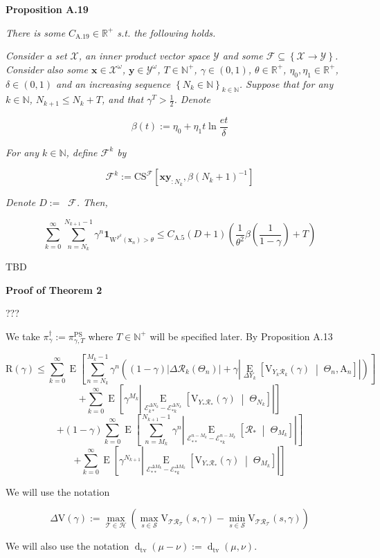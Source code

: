 \documentclass[a4paper]{article}
\newcommand{\Co}[1]{}
\newcommand{\AP}[1]{\left(#1\right)}
\newcommand{\AB}[1]{\left[#1\right]}
\newcommand{\AC}[1]{\left\{#1\right\}}
\newcommand{\ABM}[2]{\left[#1\;\middle\vert\;#2\right]}
\newcommand{\Abs}[1]{\left\vert #1 \right\vert}
\newcommand{\E}[1]{\operatorname{E}\AB{#1}}
\newcommand{\CE}[3]{\underset{#1}{\operatorname{E}}\ABM{#2}{#3}}
\newcommand{\Dtva}[1]{\operatorname{d}_{\text{tv}}\AP{#1}}
\newcommand{\Nats}{\mathbb{N}}
\newcommand{\Reals}{\mathbb{R}}
\newcommand{\St}{\mathcal{S}}
\newcommand{\R}{\mathcal{R}}
\newcommand{\T}{\mathcal{T}}
\newcommand{\Hy}{\mathcal{H}}
\DeclareMathOperator{\RVO}{\dim_{RVO}}
\newcommand{\X}{\mathcal{X}}
\newcommand{\Y}{\mathcal{Y}}
\newcommand{\V}{\mathrm{V}}
\newcommand{\Reg}{\mathrm{R}}
\newcommand{\PSR}{\text{PS}}
\newcommand{\THy}{Y_*}
\newcommand{\SHy}{Y}
\newcommand{\AT}{\mathrm{A}}
\newcommand{\Ev}{\mathcal{E}}
\newcommand{\ET}{N}
\newcommand{\IT}{M}
\newcommand{\F}{\mathcal{F}}
\newcommand{\CS}{\mathrm{CS}}
\newcommand{\W}{\mathrm{W}}
\begin{document}
\textbf{Proposition A.19}\Co{b}

\textit{There is some $C_{\mathrm{A.19}}\in\Reals^+$ s.t. the following holds.}\Co{i}

\textit{Consider a set $\X$, an inner product vector space $\Y$ and some $\F\subseteq\AC{\X\rightarrow\Y}$. Consider also some $\boldsymbol{x}\in\X^\omega$, $\boldsymbol{y}\in\Y^\omega$, $T\in\Nats^+$, $\gamma\in(0,1)$, $\theta\in\Reals^+$, $\eta_0,\eta_1\in\Reals^+$, $\delta\in(0,1)$ and an increasing sequence $\AC{N_k\in\Nats}_{k\in\Nats}$. Suppose that for any $k\in\Nats$, $N_{k+1}\leq N_k+T$, and that $\gamma^T>\frac{1}{2}$. Denote}\Co{i}

$$\beta(t):=\eta_0 + \eta_1t\ln{\frac{et}{\delta}}$$

\textit{For any $k\in\Nats$, define $\F^k$ by}\Co{i}

$$\F^k:=\CS^\F\AB{\boldsymbol{xy}_{:N_k},\beta\AP{N_k+1}^{-1}}$$

\textit{Denote $D:=\RVO\F$. Then,}\Co{i}

$$\sum_{k=0}^\infty\sum_{n=N_k}^{N_{k+1}-1}{\gamma^{n}\boldsymbol{1}_{\W^{F^k}\AP{\boldsymbol{x}_{n}}>\theta}} \leq C_{\mathrm{A.5}}(D+1)\AP{\frac{1}{\theta^2}\beta\AP{\frac{1}{1-\gamma}}+T}$$

TBD

\textbf{Proof of Theorem 2}\Co{b}

???

We take $\pi^\dagger_\gamma:=\pi^\PSR_{\gamma,T}$ where $T\in\Nats^+$ will be specified later. By Proposition A.13

$$\Reg(\gamma)\leq\sum_{k=0}^\infty\E{\sum_{n=\ET_k}^{\IT_k-1}\gamma^{n}\AP{(1-\gamma)\Abs{\Delta\R_k\AP{\Theta_n}}+\gamma\Abs{\CE{\Delta\SHy_k}{\V_{\SHy_k\R_k}(\gamma)}{\Theta_n,\AT_n}}}}$$
$$+\sum_{k=0}^\infty\E{{\gamma^{\IT_k}}\Abs{\CE{\Ev_{k*}^{\Delta\ET_k}-\Ev_{*k}^{\Delta\ET_k}}{\V_{\SHy_*\R_*}(\gamma)}{\Theta_{\ET_k}}}}$$
$$+(1-\gamma)\sum_{k=0}^\infty\E{\sum_{n=\IT_k}^{\ET_{k+1}-1}\gamma^n\Abs{\CE{\Ev_{**}^{n-\IT_k}-\Ev_{*k}^{n-\IT_k}}{\R_*}{\Theta_{\IT_k}}}}$$
$$+\sum_{k=0}^\infty\E{\gamma^{\ET_{k+1}}\Abs{\CE{\Ev_{**}^{\Delta\IT_k}-\Ev_{*k}^{\Delta\IT_k}}{\V_{\THy\R_*}(\gamma)}{\Theta_{\IT_k}}}}$$

We will use the notation

$$\Delta\V(\gamma):=\max_{\T\in\Hy}{\AP{\max_{s\in\St}{\V_{\T\R_\T}(s,\gamma)}-\min_{s\in\St}{\V_{\T\R_\T}(s,\gamma)}}}$$

We will also use the notation $\Dtva{\mu-\nu}:=\Dtva{\mu,\nu}$.
\end{document}
